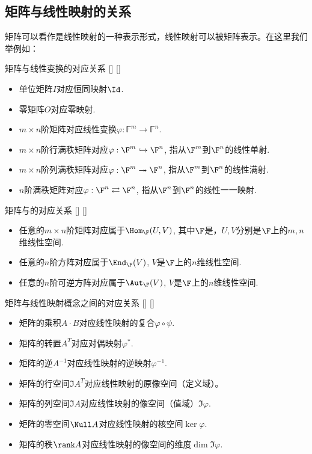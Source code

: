 \documentclass[UTF8]{ctexart}
\begin{document}
	\subsection{矩阵与线性映射的关系}
		矩阵可以看作是线性映射的一种表示形式，线性映射可以被矩阵表示。在这里我们举例如：
		\begin{xmp}
			[]
			{矩阵与线性变换的对应关系}
			[]
			[]

			\begin{itemize}
				\item 单位矩阵$I$对应恒同映射$\Id$.
				\item 零矩阵$O$对应零映射.
				\item $m\times n$阶矩阵对应线性变换$\varphi : \mathbb F^m \to \mathbb F^n$.
				\item $m\times n$阶行满秩矩阵对应$\varphi:\F^m\hookrightarrow \F^n$, 指从$\F^m$到$\F^n$的线性单射.
				\item $m\times n$阶列满秩矩阵对应$\varphi:\F^m\twoheadrightarrow \F^n$, 指从$\F^m$到$\F^n$的线性满射.
				\item $n$阶满秩矩阵对应$\varphi:\F^n\rightleftarrows \F^n$, 指从$\F^n$到$\F^n$的线性一一映射.
			\end{itemize}
		\end{xmp}

		\begin{xmp}
			[]
			{矩阵与 的对应关系}
			[]
			[]

			\begin{itemize}
				\item 任意的$m\times n$阶矩阵对应属于$\Hom_{\F}(U,V)$, 其中$\F$是，$U,V$分别是$\F$上的$m,n$维线性空间.
				\item 任意的$n$阶方阵对应属于$\End_{\F}(V)$, $V$是$\F$上的$n$维线性空间.
				\item 任意的$n$阶可逆方阵对应属于$\Aut_{\F}(V)$, $V$是$\F$上的$n$维线性空间.
			\end{itemize}
		\end{xmp}

		\begin{xmp}
			[]
			{矩阵与线性映射概念之间的对应关系}
			[]
			[]

			\begin{itemize}
				\item 矩阵的乘积$A\cdot B$对应线性映射的复合$\varphi\circ\psi$.
				\item 矩阵的转置$A^T$对应对偶映射$\varphi^*$.
				\item 矩阵的逆$A^{-1}$对应线性映射的逆映射$\varphi^{-1}$.
				\item 矩阵的行空间$\Im A^T$对应线性映射的原像空间（定义域）。
				\item 矩阵的列空间$\Im A$对应线性映射的像空间（值域）$\Im\varphi$.
				\item 矩阵的零空间$\Null A$对应线性映射的核空间$\ker \varphi$.
				\item 矩阵的秩$\rank A$对应线性映射的像空间的维度$\dim\Im\varphi$.
			\end{itemize}
		\end{xmp}
\end{document}

